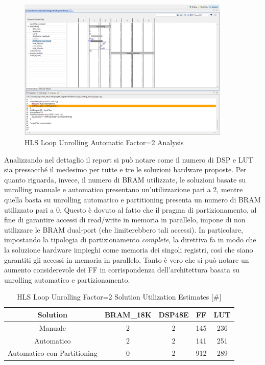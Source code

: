 \begin{figure}[H]
    \centering
    \includegraphics[width=0.9\textwidth]{solutions/loop_unrolling/factor2/loopunrollingautomatic2.png}
    \caption{HLS Loop Unrolling Automatic Factor=2 Analysis}
\end{figure}

Analizzando nel dettaglio il report si può notare come il numero di DSP e LUT sia pressocché il medesimo per tutte e tre le soluzioni hardware proposte. Per quanto riguarda, invece, il numero di BRAM utilizzate, le soluzioni basate su unrolling manuale e automatico presentano un'utilizzazione pari a 2, mentre quella basta su unrolling automatico e partitioning presenta un numero di BRAM utilizzato pari a 0. Questo è dovuto al fatto che il pragma di partizionamento, al fine di garantire accessi di read/write in memoria in parallelo, impone di non utilizzare le BRAM dual-port (che limiterebbero tali accessi). In particolare, impostando la tipologia di partizionamento \textit{complete}, la direttiva fa in modo che la soluzione hardware impieghi come memoria dei singoli registri, cosí che siano garantiti gli accessi in memoria in parallelo. Tanto è vero che si può notare un aumento considerevole dei FF in corrispondenza dell'architettura basata su unrolling automatico e partizionamento.

\begin{table}[H]
    \centering
    \begin{tabular}{|c|c|c|c|c|}
        \hline
        \textbf{Solution} & \textbf{BRAM\_18K} & \textbf{DSP48E} & \textbf{FF} & \textbf{LUT} \\
        \hline
        Manuale & 2 & 2 & 145 & 236 \\
        \hline
        Automatico & 2 & 2 & 141 & 251 \\
        \hline
        Automatico con Partitioning & 0 & 2 & 912 & 289 \\
        \hline
    \end{tabular}
    \caption{HLS Loop Unrolling Factor=2 Solution Utilization Estimates [\#]}
    \label{tab:hls-loop-unrolling-factor2-solution-utilization-report}
\end{table}

